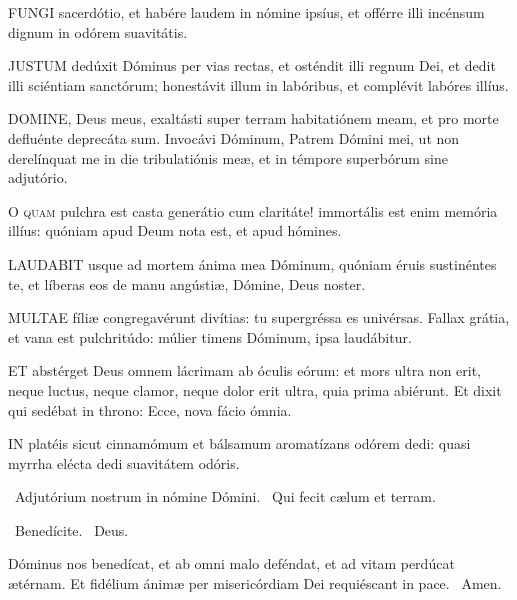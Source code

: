
\lettrine[lines=2]{F}{UNGI} sacerdótio, et habére laudem in nómine ipsíus, et offérre illi incénsum dignum in odórem suavitátis.


\lettrine[lines=2]{J}{USTUM} dedúxit Dóminus per vias rectas, et osténdit illi regnum Dei, et dedit illi sciéntiam sanctórum; honestávit illum in labóribus, et complévit labóres illíus.


\lettrine[lines=2]{D}{OMINE}, Deus meus, exaltásti super terram habitatiónem meam, et pro morte defluénte deprecáta sum. Invocávi Dóminum, Patrem Dómini mei, ut non derelínquat me in die tribulatiónis meæ, et in témpore superbórum sine adjutório.


\lettrine[lines=2]{O}{} \textsc{quam} pulchra est casta generátio cum claritáte! immortális est enim memória illíus: quóniam apud Deum nota est, et apud hómines.


\lettrine[lines=2]{L}{AUDABIT} usque ad mortem ánima mea Dóminum, quóniam éruis sustinéntes te, et líberas eos de manu angústiæ, Dómine, Deus noster.


\lettrine[lines=2]{M}{ULTAE} fíliæ congregavérunt divítias: tu supergréssa es univérsas. Fallax grátia, et vana est pulchritúdo: múlier timens Dóminum, ipsa laudábitur.


\lettrine[lines=2]{E}{T} abstérget Deus omnem lácrimam ab óculis eórum: et mors ultra non erit, neque luctus, neque clamor, neque dolor erit ultra, quia prima abiérunt. Et dixit qui sedébat in throno: Ecce, nova fácio ómnia.


\lettrine[lines=2]{I}{N} platéis sicut cinnamómum et bálsamum aromatízans odórem dedi: quasi myrrha elécta dedi suavitátem odóris.

\sectionornament

\V\ Adjutórium nostrum in nómine Dómini. \R\ Qui fecit cælum et terram.

\V\ Benedícite. \R\ Deus.

 Dóminus nos benedícat, et ab omni malo deféndat, et ad vitam perdúcat ætérnam. Et fidélium ánimæ per misericórdiam Dei requiéscant in pace. \R\ Amen.

